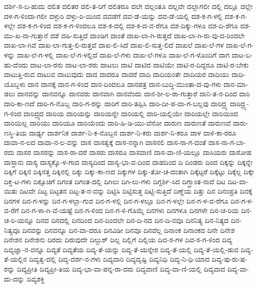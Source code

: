 {ದರ್ಶಿ-ಸ-ಬ-ಹುದು
ದಲಿತ
ದಲಿತರ
ದಲಿ-ತ-ರಿಗೆ
ದಲಿತರೂ
ದಲೇ
ದಲ್ಲಂತೂ
ದಲ್ಲವೇ
ದಲ್ಲಾಗಲೀ
ದಲ್ಲಿ
ದಲ್ಲೂ
ದಲ್ಲೇ
ದಳ-ಗ-ಳಿಂದಾ-ಗಲೀ
ದಳ್ಳುರಿ
ದಳ್ಳು-ರಿ-ಯಿಂದ
ದವಡೆಗೆ
ದವ-ಡೆ-ಯನ್ನು
ದವ-ಡೆ-ಯಲ್ಲಿ
ದಶ-ಕ-ಗ-ಳಲ್ಲಿ
ದಶ-ಕ-ಗ-ಳಲ್ಲೇ
ದಶ-ಕ-ಗ-ಳಿಂದ
ದಶ-ಕ-ಗ-ಳಿಂದಲೂ
ದಶ-ಕ-ದಲ್ಲಿ
ದಶ-ಕ-ದ-ವ-ರೆಗೂ
ದಶ-ದಿಕ್ಕು-ಗಳೂ
ದಶ-ದಿ-ಶೆಗೂ
ದಶ-ಮು-ಖ-ನಾ-ಗುತ್ತಾನೆ
ದಶೆ
ದಹಿ-ಸುತ್ತಿದೆ
ದಾಂಡಿಗ
ದಾಂತೆ
ದಾಖ-ಲಾ-ಗಿ-ರುತ್ತದೆ
ದಾಖ-ಲಾ-ಗಿ-ರು-ವು-ದ-ರಿಂದಲೇ
ದಾಖ-ಲಾ-ಗಿವೆ
ದಾಖ-ಲಾ-ಗುತ್ತ-ಲಿ-ರುತ್ತವೆ
ದಾಖ-ಲಿ-ಸಿದೆ
ದಾಖ-ಲಿ-ಸುತ್ತ-ಲಿದೆ
ದಾಖಲೆ
ದಾಖ-ಲೆ-ಗಳ
ದಾಖ-ಲೆ-ಗ-ಳನ್ನು
ದಾಖ-ಲೆ-ಗ-ಳಲ್ಲಿ
ದಾಖ-ಲೆ-ಗ-ಳಲ್ಲಿದೆ
ದಾಖ-ಲೆ-ಗಳು
ದಾಖ-ಲೆ-ಗಳೂ
ದಾಖ-ಲೆ-ಗ-ಳೊಂದಿಗೆ
ದಾಗ
ದಾಟ-ಬ-ಹು-ದೆಂದು
ದಾಟ-ಲಾ-ರನು
ದಾಟ-ಲಾ-ರರು
ದಾಟಲು
ದಾಟಿ
ದಾಟಿದ
ದಾಟಿಯೇ
ದಾಟಿ-ರ-ದಿದ್ದರೂ
ದಾಟಿ-ರ-ಬೇಕು
ದಾಟುತ್ತಿ-ರುವ
ದಾಟುವ
ದಾಟುವುದು
ದಾದ
ದಾದರೂ
ದಾದರೆ
ದಾದಿ
ದಾದಿಯಂತೇ
ದಾದಿಯರ
ದಾದಿಯು
ದಾದಿ-ಯೊಬ್ಬಳು
ದಾನ
ದಾನಕ್ಕೆ
ದಾನ-ಗ-ಳಿಂದ
ದಾನ-ದಿಂದಲೂ
ದಾನಪತ್ರ
ದಾನ-ಬುದ್ಧಿ-ಮುಂತಾ-ದ-ವು-ಗಳು
ದಾನ-ಮಾ-ಡಲು
ದಾನವನ್ನು
ದಾನವನ್ನೂ
ದಾನವರು
ದಾನವಾಗಿ
ದಾನವೆಂದು
ದಾನ-ಶೀ-ಲ-ರಾ-ಗುತ್ತಾರೆ
ದಾನಿ-ತ-ನ-ದಿಂದ
ದಾರಿ
ದಾರಿ-ಕಾ-ಣದೆ
ದಾರಿ-ಗ-ನೊಬ್ಬ
ದಾರಿ-ಗ-ರನ್ನು
ದಾರಿಗೆ
ದಾರಿ-ತಪ್ಪಿಸಿ
ದಾರಿ-ದೀ-ಪ-ವಾ-ಗ-ಬಲ್ಲವು
ದಾರಿದ್ರ್ಯ
ದಾರಿದ್ರ್ಯ-ಗ-ಳಿಂದ
ದಾರಿದ್ರ್ಯದ
ದಾರಿಯ
ದಾರಿಯನ್ನು
ದಾರಿಯನ್ನೇ
ದಾರಿಯಲ್ಲಿ
ದಾರಿ-ಯಲ್ಲಿಯೇ
ದಾರಿಯಲ್ಲೇ
ದಾರಿಯಿಂದ
ದಾರಿಯಿಲ್ಲ
ದಾರಿಯು
ದಾರಿಯೂ
ದಾರಿಯೆಂದು
ದಾರಿ-ಹಿ-ಡಿ-ಯು-ವೆನೋ
ದಾರುಣ
ದಾರುಣತೆ
ದಾರುಣವೆ
ದಾರು-ಣಸ್ಥಿ-ತಿಯ
ದಾರ್ಢ್ಯ
ದಾರ್ಶನಿಕ
ದಾರ್ಶ-ನಿ-ಕ-ನೊಬ್ಬನ
ದಾರ್ಶ-ನಿ-ಕರು
ದಾರ್ಶ-ನಿ-ಕರೂ
ದಾಳ
ದಾಳಿ-ಕಾ-ರರೂ
ದಾವಾ-ನ-ಲದ
ದಾವಾ-ನ-ಲ-ವನ್ನು
ದಾಸ
ದಾಸತ್ವಕ್ಕೆ
ದಾಸ-ನನ್ನಾಗಿ
ದಾಸನಲಿ
ದಾಸ-ನಾ-ಗ-ದಂತೆ
ದಾಸ-ನಾ-ಗ-ಬಾ-ರದು
ದಾಸರ
ದಾಸರನ್ನು
ದಾಸ-ರಾ-ದರೆ
ದಾಸರು
ದಾಸರೂ
ದಾಸವಾಣಿ
ದಾಸ-ವಾ-ಣಿ-ಯಲ್ಲೂ
ದಾಸಿಯರು
ದಾಸೋಹ
ದಾಸ್ತಾನು
ದಾಸ್ಯ
ದಾಸ್ಯಕ್ಕೊ-ಳ-ಗಾದ
ದಾಸ್ಯದಿಂದ
ದಾಸ್ಯ-ಭಾ-ವ-ದಿಂದ
ದಾಹದಿಂದ
ದಿ
ದಿಂಡರು
ದಿಂದ
ದಿಕ್ಕನ್ನು
ದಿಕ್ಕನ್ನೇ
ದಿಕ್ಕಿಗೆ
ದಿಕ್ಕಿನ
ದಿಕ್ಕಿನತ್ತ
ದಿಕ್ಕಿನಲ್ಲಿ
ದಿಕ್ಕು
ದಿಕ್ಕು-ಕಾ-ಣದ
ದಿಕ್ಕುಗಳ
ದಿಕ್ಕು-ತೋ-ಚ-ದಂತಾಗಿ
ದಿಕ್ಕೆಟ್ಟರೆ
ದಿಕ್ಕೆಟ್ಟು
ದಿಕ್ಕೆಲ್ಲ
ದಿಕ್ಕೇ
ದಿಕ್ತ-ಟ-ಗಳು
ದಿಕ್ಸೂಚಿಗೆ
ದಿಗಂತ
ದಿಗಂತ-ದಲ್ಲಿ
ದಿಗಿಲು
ದಿಗಿ-ಲು-ಗಳು
ದಿಗ್ದರ್ಶಿ-ಸಿದ
ದಿಗ್ಭ್ರಾಂತ-ನಾದೆ
ದಿಟ
ದಿಟ-ವಾ-ಯಿತು
ದಿಟವೇ
ದಿಟ್ಟ
ದಿಟ್ಟತನ
ದಿಟ್ಟ-ತ-ನ-ವನ್ನು
ದಿಟ್ಟಿಸಿ
ದಿಟ್ಟಿಸುತ್ತ
ದಿಟ್ಟಿ-ಸುತ್ತಿದೆ
ದಿಣ್ಣೆಯ
ದಿತ್ತು
ದಿನ
ದಿನಂಪ್ರತಿ
ದಿನಕ್ಕೆ
ದಿನಗಳ
ದಿನ-ಗ-ಳನ್ನು
ದಿನ-ಗ-ಳಲ್ಲಾ-ಗುವ
ದಿನ-ಗ-ಳಲ್ಲಿ
ದಿನ-ಗ-ಳಲ್ಲೂ
ದಿನ-ಗ-ಳಲ್ಲೇ
ದಿನ-ಗ-ಳ-ವ-ರೆಗೂ
ದಿನ-ಗ-ಳ-ವ-ರೆಗೆ
ದಿನ-ಗ-ಳಾ-ಗಿ-ವೆ-ಯಷ್ಟೆ
ದಿನ-ಗ-ಳಿಂದ
ದಿನ-ಗ-ಳಿ-ಗೊಮ್ಮೆ
ದಿನಗಳು
ದಿನಗಳೂ
ದಿನಗಳೇ
ದಿನ-ಚ-ರಿಯ
ದಿನ-ಚ-ರಿ-ಯನ್ನೂ
ದಿನದ
ದಿನದಲ್ಲಿ
ದಿನದಿಂದ
ದಿನ-ದಿಂದಲೇ
ದಿನ-ದಿ-ನದ
ದಿನ-ದಿ-ನವೂ
ದಿನನಿತ್ಯ
ದಿನ-ನಿತ್ಯದ
ದಿನ-ನಿತ್ಯವೂ
ದಿನವನ್ನು
ದಿನವನ್ನೂ
ದಿನ-ವಾ-ದರೂ
ದಿನವಿಡೀ
ದಿನವೂ
ದಿನವೆಲ್ಲ
ದಿನಾಂಕ
ದಿನಾಂಕದ
ದಿನೇ
ದಿನೇಶ
ದಿನೇಶನ
ದಿನೇಶನು
ದಿರದು
ದಿರುವುದೇ
ದಿಲ್ಖುಶ್
ದಿಲ್ಲ
ದಿಲ್ಲಿಗೆ
ದಿಲ್ಲಿಯ
ದಿವ-ಸ-ಗಳ
ದಿವ-ಸ-ಗ-ಳಿಂದ
ದಿವ್ಯ
ದಿವ್ಯಜ್ಞಾ-ನ-ವನ್ನೂ
ದಿವ್ಯತೆ
ದಿವ್ಯತೆಯ
ದಿವ್ಯ-ತೆ-ಯನ್ನು
ದಿವ್ಯ-ತೆ-ಯನ್ನೇರ
ದಿವ್ಯ-ತೆ-ಯಲ್ಲಿ
ದಿವ್ಯ-ತೆ-ಯಲ್ಲಿ-ಡುವ
ದಿವ್ಯ-ತೆ-ಯಲ್ಲಿನ
ದಿವ್ಯತ್ವ-ದಲ್ಲಿ
ದಿವ್ಯ-ದರ್ಶ-ನ-ಗಳು
ದಿವ್ಯದಾರಿ
ದಿವ್ಯದೃಷ್ಟಿ
ದಿವ್ಯನಿಧಿ
ದಿವ್ಯ-ನಿ-ಧಿ-ಯಾದ
ದಿವ್ಯ-ಪು-ರು-ಷ-ರನ್ನು
ದಿವ್ಯಪ್ರೀತಿ
ದಿವ್ಯಪ್ರೀ-ತಿಯ
ದಿವ್ಯ-ಭಾ-ವಾ-ಪನ್ನ-ರಾ-ದರು
ದಿವ್ಯವಾಣಿ
ದಿವ್ಯ-ವಾ-ಣಿ-ಯಲ್ಲಿ
ದಿವ್ಯವಾದ
ದಿವ್ಯ-ವಾ-ದು-ದನ್ನು
ದಿವ್ಯಶಕ್ತಿ
}
